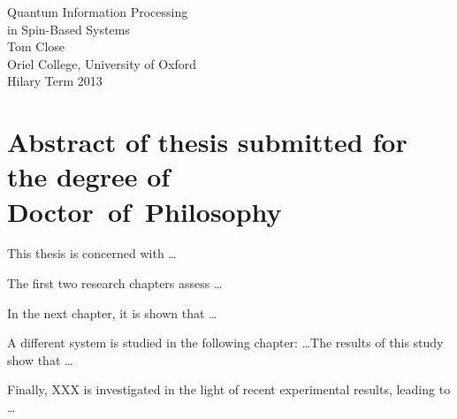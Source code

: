 
\begin{center}

  {\Huge Quantum Information Processing \\[0.5cm] 
               in Spin-Based Systems}\\[1cm]

  {\large Tom Close\\
               Oriel College, University of Oxford\\
               Hilary Term 2013\\[1cm]
  }

\end{center}
 
\section*{Abstract of thesis submitted for the degree of \mbox{Doctor of Philosophy}} 

This thesis is concerned with \ldots

The first two research chapters assess \ldots

In the next chapter, it is shown that \ldots

A different system is studied in the following chapter: \ldots  The results of this study show that \ldots

Finally, XXX is investigated in the light of recent experimental results, leading to \ldots
